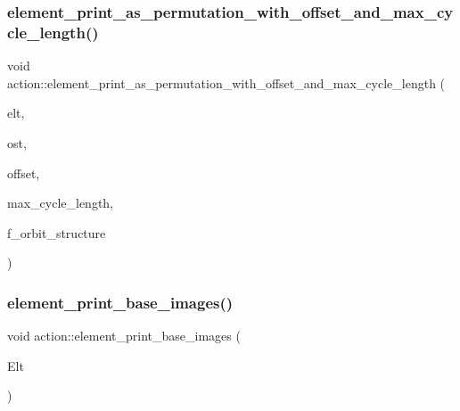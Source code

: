 \subsubsection{\texorpdfstring{element\+\_\+print\+\_\+as\+\_\+permutation\+\_\+with\+\_\+offset\+\_\+and\+\_\+max\+\_\+cycle\+\_\+length()}{element\_print\_as\_permutation\_with\_offset\_and\_max\_cycle\_length()}}
{\footnotesize\ttfamily void action\+::element\+\_\+print\+\_\+as\+\_\+permutation\+\_\+with\+\_\+offset\+\_\+and\+\_\+max\+\_\+cycle\+\_\+length (\begin{DoxyParamCaption}\item[{void $\ast$}]{elt,  }\item[{ostream \&}]{ost,  }\item[{\mbox{\hyperlink{galois_8h_a09fddde158a3a20bd2dcadb609de11dc}{I\+NT}}}]{offset,  }\item[{\mbox{\hyperlink{galois_8h_a09fddde158a3a20bd2dcadb609de11dc}{I\+NT}}}]{max\+\_\+cycle\+\_\+length,  }\item[{\mbox{\hyperlink{galois_8h_a09fddde158a3a20bd2dcadb609de11dc}{I\+NT}}}]{f\+\_\+orbit\+\_\+structure }\end{DoxyParamCaption})}

\mbox{\label{classaction_a2b9adf554aaa2eb6caf62396133ecf35}} 
\subsubsection{\texorpdfstring{element\+\_\+print\+\_\+base\+\_\+images()}{element\_print\_base\_images()}\hspace{0.1cm}{\footnotesize\ttfamily [1/2]}}
{\footnotesize\ttfamily void action\+::element\+\_\+print\+\_\+base\+\_\+images (\begin{DoxyParamCaption}\item[{\mbox{\hyperlink{galois_8h_a09fddde158a3a20bd2dcadb609de11dc}{I\+NT}} $\ast$}]{Elt }\end{DoxyParamCaption})}

\mbox{\label{classaction_ad69d6278c50f23aee06fdd42423f9b8c}} 
